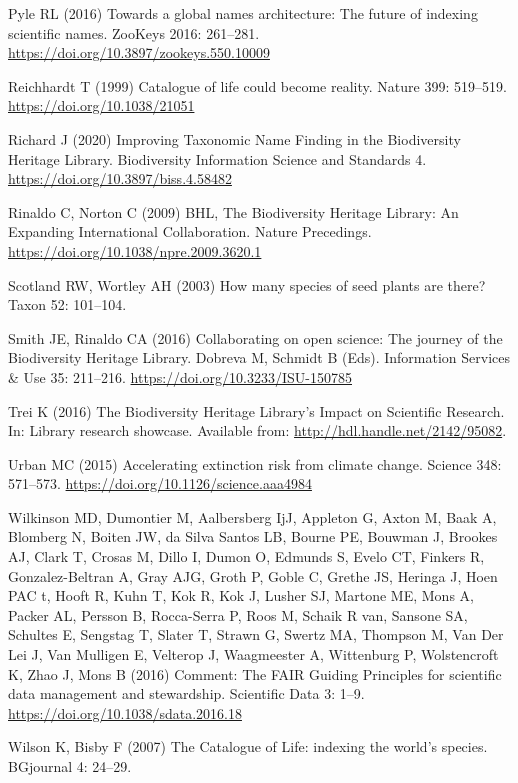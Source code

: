 \documentclass[
]{article}
\newlength{\cslhangindent}
\newlength{\cslentryspacingunit} %
\newenvironment{CSLReferences}[2] %
 {%
  \setlength{\parindent}{0pt}
  \ifodd #1
  \let\oldpar\par
  \def\par{\hangindent=\cslhangindent\oldpar}
  \fi
  \setlength{\parskip}{#2\cslentryspacingunit}
 }%
 {}
\begin{document}
\begin{CSLReferences}{1}{0}
\leavevmode{}%
Pyle RL (2016) {Towards a global names architecture: The future of
indexing scientific names}. ZooKeys 2016: 261--281.
\url{https://doi.org/10.3897/zookeys.550.10009}

\leavevmode{}%
Reichhardt T (1999) {Catalogue of life could become reality}. Nature
399: 519--519. \url{https://doi.org/10.1038/21051}

\leavevmode{}%
Richard J (2020) {Improving Taxonomic Name Finding in the Biodiversity
Heritage Library}. Biodiversity Information Science and Standards 4.
\url{https://doi.org/10.3897/biss.4.58482}

\leavevmode{}%
Rinaldo C, Norton C (2009) {BHL, The Biodiversity Heritage Library: An
Expanding International Collaboration}. Nature Precedings.
\url{https://doi.org/10.1038/npre.2009.3620.1}

\leavevmode{}%
Scotland RW, Wortley AH (2003) {How many species of seed plants are
there?} Taxon 52: 101--104.

\leavevmode{}%
Smith JE, Rinaldo CA (2016) {Collaborating on open science: The journey
of the Biodiversity Heritage Library}. Dobreva M, Schmidt B (Eds).
Information Services \& Use 35: 211--216.
\url{https://doi.org/10.3233/ISU-150785}

\leavevmode{}%
Trei K (2016) {The Biodiversity Heritage Library's Impact on Scientific
Research}. In: Library research showcase. Available from:
\url{http://hdl.handle.net/2142/95082}.

\leavevmode{}%
Urban MC (2015) {Accelerating extinction risk from climate change}.
Science 348: 571--573. \url{https://doi.org/10.1126/science.aaa4984}

\leavevmode{}%
Wilkinson MD, Dumontier M, Aalbersberg IjJ, Appleton G, Axton M, Baak A,
Blomberg N, Boiten JW, da Silva Santos LB, Bourne PE, Bouwman J, Brookes
AJ, Clark T, Crosas M, Dillo I, Dumon O, Edmunds S, Evelo CT, Finkers R,
Gonzalez-Beltran A, Gray AJG, Groth P, Goble C, Grethe JS, Heringa J,
Hoen PAC t, Hooft R, Kuhn T, Kok R, Kok J, Lusher SJ, Martone ME, Mons
A, Packer AL, Persson B, Rocca-Serra P, Roos M, Schaik R van, Sansone
SA, Schultes E, Sengstag T, Slater T, Strawn G, Swertz MA, Thompson M,
Van Der Lei J, Van Mulligen E, Velterop J, Waagmeester A, Wittenburg P,
Wolstencroft K, Zhao J, Mons B (2016) {Comment: The FAIR Guiding
Principles for scientific data management and stewardship}. Scientific
Data 3: 1--9. \url{https://doi.org/10.1038/sdata.2016.18}

\leavevmode{}%
Wilson K, Bisby F (2007) {The Catalogue of Life: indexing the world's
species}. BGjournal 4: 24--29.

\end{CSLReferences}
\end{document}
